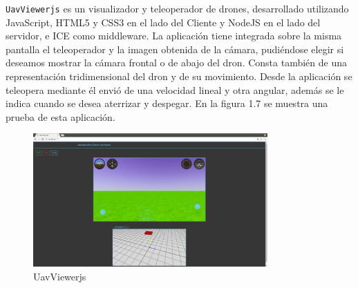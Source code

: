 \texttt{UavViewerjs} es un visualizador y teleoperador de drones, desarrollado utilizando JavaScript, HTML5 y CSS3 en el lado del Cliente y NodeJS en el lado del servidor, e ICE como middleware. La aplicación tiene integrada sobre la misma pantalla el teleoperador y la imagen obtenida de la cámara, pudiéndose elegir si deseamos mostrar la cámara frontal o de abajo del dron. Consta también de una representación tridimensional del dron y de su movimiento. Desde la aplicación se teleopera mediante él envió de una velocidad lineal y otra angular, además se le indica cuando se desea aterrizar y despegar. En la figura 1.7 se muestra una prueba de esta aplicación.

\begin{figure}[H]
  \begin{center}
    \includegraphics[width=0.8\textwidth]{figures/uavviewerjs.png}
		\caption{UavViewerjs}
		\label{fig.uavviewerjs}
		\end{center}
\end{figure}